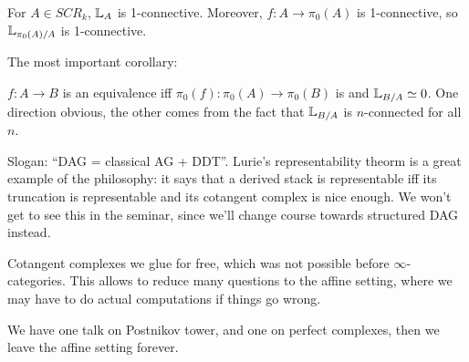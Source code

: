 \begin{cor}
For $A \in SCR_k$, $\mathbb L_A$ is 1-connective. Moreover, $f:A \to \pi_0(A)$ is 1-connective, so $\mathbb L_{\pi_0(A)/A}$ is
1-connective.
\end{cor}

The most important corollary:
\begin{cor}
$f: A \to B$ is an equivalence iff $\pi_0(f) : \pi_0(A) \to \pi_0(B)$ is and $\mathbb L_{B/A} \simeq 0$. One direction obvious, the
other comes from the fact that $\mathbb L_{B/A}$ is $n$-connected for all $n$.
\end{cor}

\begin{rem}
Slogan: ``DAG = classical AG + DDT''.
Lurie's representability theorm is a great example of the philosophy: it says that a derived stack is representable iff
its truncation is representable and its cotangent complex is nice enough. We won't get to see this in the seminar, since we'll
change course towards structured DAG instead.
\end{rem}


\begin{rem}
Cotangent complexes we glue for free, which was not possible before $\infty$-categories. This allows to reduce many questions
to the affine setting, where we may have to do actual computations if things go wrong.
\end{rem}

We have one talk on Postnikov tower, and one on perfect complexes, then we leave the affine setting forever.



